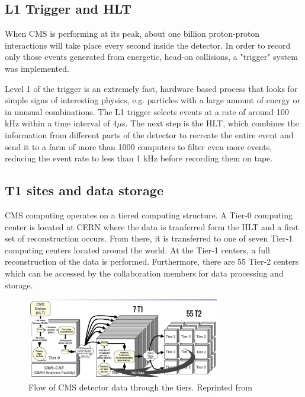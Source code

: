 \subsection{L1 Trigger and HLT}
 When CMS is performing at its peak, about one billion proton-proton interactions will take place every second inside the detector. In order to record only those events generated from energetic, head-on collisions, a "trigger" system was implemented.

Level 1 of the trigger is an extremely fast, hardware based process that looks for simple signs of interesting physics, e.g. particles with a large amount of energy or in unusual combinations. The L1 trigger selects events at a rate of around 100 kHz within a time interval of 4$\mu$s. The next step is the HLT, which combines the information from different parts of the detector to recreate the entire event and send it to a farm of more than 1000 computers to filter even more events, reducing the event rate to less than 1 kHz before recording them on tape.

\subsection{T1 sites and data storage}

CMS computing operates on a tiered computing structure. A Tier-0 computing center is located at CERN where the data is tranferred form the HLT and a first set of reconstruction occurs. From there, it is transferred to one of seven Tier-1 computing centers located around the world. At the Tier-1 centers, a full reconstruction of the data is performed. Furthermore, there are 55 Tier-2 centers which can be accessed by the collaboration members for data processing and storage.

 \begin{figure}[H]
 	\centering
 	\includegraphics[width=0.75\textwidth]{figures/dataflowtiers_MC.gif}
 	\singlespace
 	\caption{Flow of CMS detector data through the tiers. Reprinted from \cite{CMSdatatier}}
 	\label{fig:datatier}
 \end{figure}

